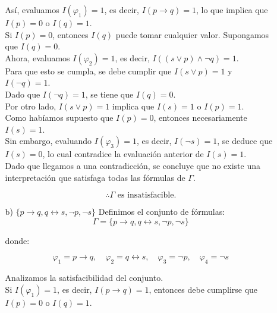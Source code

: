 \documentclass[11pt,letterpaper]{article}
\begin{document}
\begin{enumerate}
\begin{itemize}
         Así, evaluamos $I(\varphi_1) = 1$, es decir, $I(p \rightarrow q) = 1$, lo que implica que $I(p) = 0$ o $I(q) = 1$.\\
         
         Si $I(p) = 0$, entonces $I(q)$ puede tomar cualquier valor. Supongamos que $I(q) = 0$.\\

         Ahora, evaluamos $I(\varphi_2) = 1$, es decir, $I((s \vee p) \land \neg q) = 1$.\\
         
         Para que esto se cumpla, se debe cumplir que $I(s \vee p) = 1$ y $I(\neg q) = 1$.\\
         
         Dado que $I(\neg q) = 1$, se tiene que $I(q) = 0$.\\

         Por otro lado, $I(s \vee p) = 1$ implica que $I(s) = 1$ o $I(p) = 1$.\\
         
         Como habíamos supuesto que $I(p) = 0$, entonces necesariamente $I(s) = 1$.\\

         Sin embargo, evaluando $I(\varphi_3) = 1$, es decir, $I(\neg s) = 1$,
         se deduce que $I(s) = 0$, lo cual contradice la evaluación anterior de $I(s) = 1$.\\

         Dado que llegamos a una contradicción, se concluye que no existe una interpretación que satisfaga todas las fórmulas de $\Gamma$.  

         \[
         \therefore \Gamma \text{ es insatisfacible.}
         \]

         \bigskip
         
       \item[b)] $\{ p \rightarrow q, q \leftrightarrow s, \neg p, \neg s \}$
         Definimos el conjunto de fórmulas:
         \[
         \Gamma = \{ p \rightarrow q, q \leftrightarrow s, \neg p, \neg s \}
         \]

         donde:

         \[
         \varphi_1 = p \rightarrow q, \quad \varphi_2 = q \leftrightarrow s, \quad \varphi_3 = \neg p, \quad \varphi_4 = \neg s
         \]

         Analizamos la satisfacibilidad del conjunto.\\ 
         Si $I(\varphi_1) = 1$, es decir, $I(p \rightarrow q) = 1$, entonces debe cumplirse que $I(p) = 0$ o $I(q) = 1$.\\
         

\end{itemize}
\end{enumerate}
\end{document}
